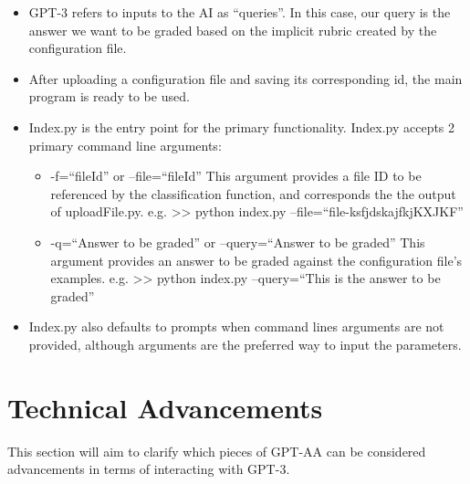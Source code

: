 \documentclass[
]{article}
\begin{document}
\begin{itemize}
\item
  GPT-3 refers to inputs to the AI as ``queries''. In this case, our
  query is the answer we want to be graded based on the implicit rubric
  created by the configuration file.
\item
  After uploading a configuration file and saving its corresponding id,
  the main program is ready to be used.
\item
  Index.py is the entry point for the primary functionality. Index.py
  accepts 2 primary command line arguments:

  \begin{itemize}
  \item
    -f=``fileId'' or --file=``fileId'' This argument provides a file ID
    to be referenced by the classification function, and corresponds the
    the output of uploadFile.py. e.g. \textgreater{}\textgreater{}
    python index.py --file=``file-ksfjdskajfkjKXJKF''
  \item
    -q=``Answer to be graded'' or --query=``Answer to be graded'' This
    argument provides an answer to be graded against the configuration
    file's examples. e.g. \textgreater{}\textgreater{} python index.py
    --query=``This is the answer to be graded''
  \end{itemize}
\item
  Index.py also defaults to prompts when command lines arguments are not
  provided, although arguments are the preferred way to input the
  parameters.
\end{itemize}

\section{Technical Advancements}\label{technical-advancements}

This section will aim to clarify which pieces of GPT-AA can be
considered advancements in terms of interacting with GPT-3.
\end{document}
